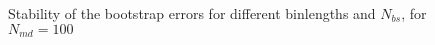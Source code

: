 \documentclass{scrartcl}
\begin{document}
%	

\begin{figure}[htbp]
	
	\caption{Stability of the bootstrap errors for different binlengths and $N_{bs}$, for $N_{md}=100$}
	\label{fig:errorstabilitynmd100}
\end{figure}
\newpage	
\listoffigures
\printbibliography
\end{document}

